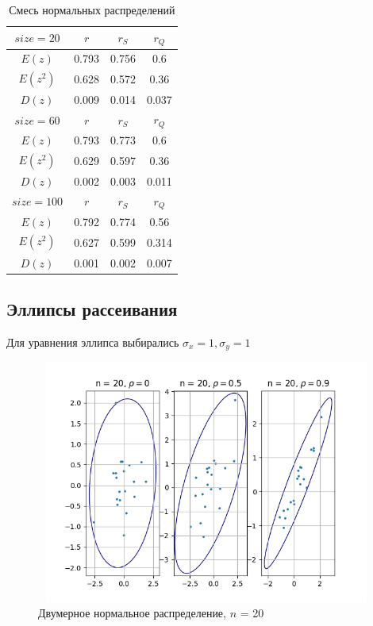 \documentclass[main.tex]{subfiles}
\begin{document}
\begin{table}[ht]
	\centering
	\begin{tabular}{| c | c | c | c |}
		
		\hline
		$size = 20$ & $r$      & $r_{S}$ & $r_{Q}$ \\
		\hline
		$E(z)$       & 0.793 & 0.756 & 0.6   \\
		$E(z^2)$    & 0.628 & 0.572 & 0.36  \\
		$D(z)$       & 0.009 & 0.014 & 0.037 \\
		\hline
		$size = 60$ & $r$      & $r_{S}$ & $r_{Q}$ \\
		\hline
		$E(z)$       & 0.793 & 0.773 & 0.6   \\
		$E(z^2)$    & 0.629 & 0.597 & 0.36  \\
		$D(z)$      & 0.002 & 0.003 & 0.011 \\
		\hline
		$size = 100$ & $r$      & $r_{S}$ & $r_{Q}$ \\
		\hline
		$E(z)$        & 0.792 & 0.774 & 0.56  \\
		$E(z^2)$     & 0.627 & 0.599 & 0.314 \\
		$D(z)$        & 0.001 & 0.002 & 0.007 \\
		\hline
		
	\end{tabular}{}
	\caption{Смесь нормальных распределений}
	\label{tab:mix_normal}
\end{table}

\FloatBarrier
\subsection{Эллипсы рассеивания}
\noindent Для уравнения эллипса выбирались $\sigma_{x} = 1, \sigma_{y} = 1$

\begin{figure}[ht]
	\centering
	\includegraphics[width = 13cm, height = 8cm]{../images/ellipse/5_20.png}
	\caption{Двумерное нормальное распределение, $n$ = 20}
	\label{fig:n20}
\end{figure}
\end{document}
